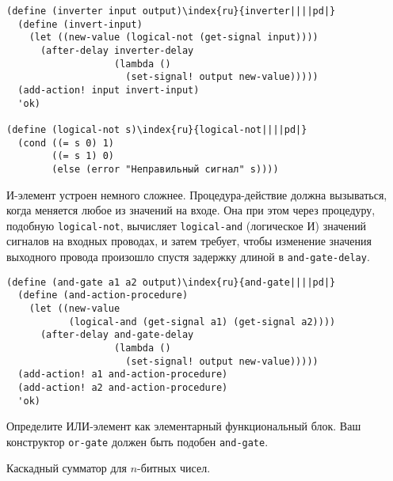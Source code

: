 \begin{Verbatim}[fontsize=\small]
(define (inverter input output)\index{ru}{inverter||||pd|}
  (define (invert-input)
    (let ((new-value (logical-not (get-signal input))))
      (after-delay inverter-delay
                   (lambda ()
                     (set-signal! output new-value)))))
  (add-action! input invert-input)
  'ok)

(define (logical-not s)\index{ru}{logical-not||||pd|}
  (cond ((= s 0) 1)
        ((= s 1) 0)
        (else (error "Неправильный сигнал" s))))
\end{Verbatim}

И-элемент устроен немного сложнее.  Процедура-действие
должна вызываться, когда меняется любое из значений на входе.  Она при
этом через процедуру, подобную {\tt logical-not},
вычисляет {\tt logical-and} (логическое И) значений сигналов
на входных проводах, и затем требует, чтобы изменение значения
выходного провода произошло спустя задержку длиной в
{\tt and-gate-delay}.

\begin{Verbatim}[fontsize=\small]
(define (and-gate a1 a2 output)\index{ru}{and-gate||||pd|}
  (define (and-action-procedure)
    (let ((new-value
           (logical-and (get-signal a1) (get-signal a2))))
      (after-delay and-gate-delay
                   (lambda ()
                     (set-signal! output new-value)))))
  (add-action! a1 and-action-procedure)
  (add-action! a2 and-action-procedure)
  'ok)
\end{Verbatim}
\begin{exercise}{3.28}\label{EX3.28}%
 Определите ИЛИ-элемент как элементарный функциональный
блок.  Ваш конструктор {\tt or-gate}
должен быть подобен {\tt and-gate}.
\end{exercise}


\begin{cntrfig}

\caption{Каскадный сумматор для
$n$-битных чисел.}
\label{P3.27}

\end{cntrfig}

